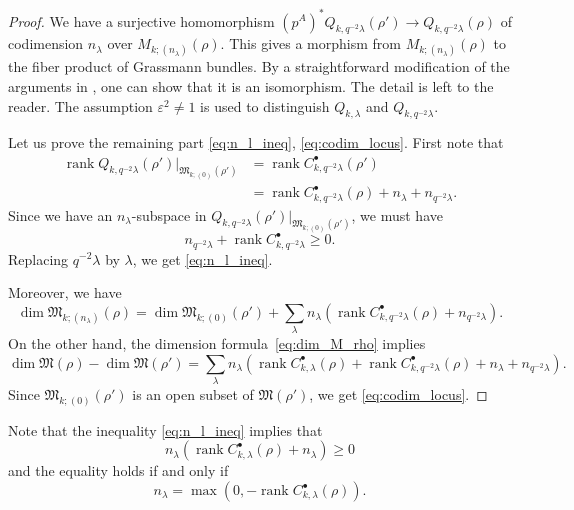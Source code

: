 \documentclass[12pt]{amsart}
\def\frak{\mathfrak}
\theoremstyle{definition}
\theoremstyle{remark}
\numberwithin{equation}{subsection}
\newcommand{\rank}{\operatorname{rank}}
\newcommand{\M}{{\frak M}} %
\begin{document}
\begin{proof}
We have a surjective homomorphism
\(
   (p^A)^* Q_{k,q^{-2}\lambda}(\rho') \to Q_{k,q^{-2}\lambda}(\rho)
\)
of codimension $n_\lambda$ over $M_{k;(n_\lambda)}(\rho)$. This gives a 
morphism from $M_{k;(n_\lambda)}(\rho)$ to the fiber product of
Grassmann bundles. By a straightforward modification of the arguments
in \cite[4.5]{Na-alg}, one can show that it is an isomorphism.
The detail is left to the reader. The assumption $\varepsilon^2 \neq
1$ is used to distinguish $Q_{k,\lambda}$ and $Q_{k,q^{-2}\lambda}$.

Let us prove the remaining part \eqref{eq:n_l_ineq}, \eqref{eq:codim_locus}.
First note that
\begin{equation*}
\begin{split}
  \rank Q_{k,q^{-2}\lambda}(\rho')|_{\M_{k;(0)}(\rho')}
  & = \rank C_{k,q^{-2}\lambda}^\bullet(\rho') \\
  & = \rank C_{k,q^{-2}\lambda}^\bullet(\rho)
        + n_\lambda + n_{q^{-2}\lambda}.
\end{split}
\end{equation*}
Since we have an $n_\lambda$-subspace in
$Q_{k,q^{-2}\lambda}(\rho')|_{\M_{k;(0)}(\rho')}$, we must have
\begin{equation*}
   n_{q^{-2}\lambda} + \rank C_{k,q^{-2}\lambda}^\bullet \ge 0.
\end{equation*}
Replacing $q^{-2}\lambda$ by $\lambda$, we get \eqref{eq:n_l_ineq}.

Moreover, we have
\begin{equation*}
  \dim \M_{k;(n_\lambda)}(\rho)
   = \dim \M_{k;(0)}(\rho')
   + \sum_\lambda n_\lambda
    \left(\rank C_{k,q^{-2}\lambda}^\bullet(\rho) + n_{q^{-2}\lambda} \right).
\end{equation*}
On the other hand, the dimension formula~\eqref{eq:dim_M_rho} implies
\begin{equation*}
   \dim \M(\rho) - \dim \M(\rho')
   = \sum_\lambda n_\lambda \left(\rank C_{k,\lambda}^\bullet(\rho) 
           + \rank C_{k,q^{-2}\lambda}^\bullet(\rho) 
           + n_{\lambda} + n_{q^{-2}\lambda}\right).
\end{equation*}
Since $\M_{k;(0)}(\rho')$ is an open subset of $\M(\rho')$, we get
\eqref{eq:codim_locus}.
\end{proof}

Note that the inequality \eqref{eq:n_l_ineq} implies that
\begin{equation*}
   n_\lambda\left(\rank C_{k,\lambda}^\bullet(\rho)+ n_\lambda\right) \ge 0
\end{equation*}
and the equality holds if and only if
\begin{equation*}
   n_\lambda = \max\left(0, -\rank C_{k,\lambda}^\bullet(\rho)\right).
\end{equation*}
\end{document}

